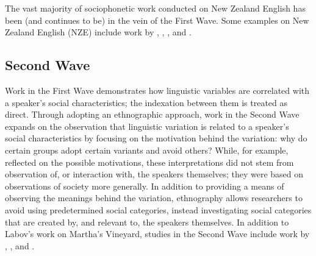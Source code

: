 The vast majority of sociophonetic work conducted on New Zealand English has been (and continues to be) in the vein of the First Wave. Some examples on New Zealand English (NZE) include work by \citet{maclagangordonlewis1999}, \citet{haymaclagan2010}, \citet{dalywarren2001}, and \citet{starksreffell2006}.


\subsection{Second Wave}\label{sec:secondwave}
Work in the First Wave demonstrates how linguistic variables are correlated with a speaker's social characteristics; the indexation between them is treated as direct. Through adopting an ethnographic approach, work in the Second Wave expands on the observation that linguistic variation is related to a speaker's social characteristics by focusing on the motivation behind the variation: why do certain groups adopt certain variants and avoid others? While, for example, \citet{trudgill1972} reflected on the possible motivations, these interpretations did not stem from observation of, or interaction with, the speakers themselves; they were based on observations of society more generally. In addition to providing a means of observing the meanings behind the variation, ethnography allows researchers to avoid using predetermined social categories, instead investigating social categories that are created by, and relevant to, the speakers themselves. In addition to Labov's work on Martha's Vineyard, studies in the Second Wave include work by \citet{holmquist1985}, \citet{eckert2000}, and \citet{milroymilroy1978}.  

